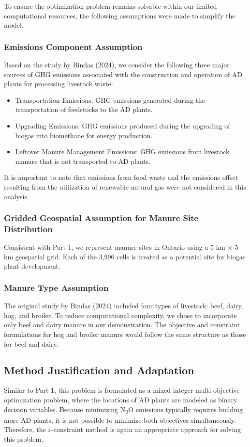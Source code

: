 \documentclass[12pt]{article}
\begin{document}
\noindent To ensure the optimization problem remains solvable within our limited computational resources, the following assumptions were made to simplify the model.

\subsubsection{Emissions Component Assumption}
Based on the study by Bindas (2024), we consider the following three major sources of GHG emissions associated with the construction and operation of AD plants for processing livestock waste:
\begin{itemize}
  \item Transportation Emissions: GHG emissions generated during the transportation of feedstocks to the AD plants.
  \item Upgrading Emissions: GHG emissions produced during the upgrading of biogas into biomethane for energy production.
  \item Leftover Manure Management Emissions: GHG emissions from livestock manure that is not transported to AD plants.
\end{itemize}
It is important to note that emissions from food waste and the emissions offset resulting from the utilization of renewable natural gas were not considered in this analysis.

\subsubsection{Gridded Geospatial Assumption for Manure Site Distribution}
Consistent with Part 1, we represent manure sites in Ontario using a 5 km × 5 km geospatial grid. Each of the 3,996 cells is treated as a potential site for biogas plant development.

\subsubsection{Manure Type Assumption}
The original study by Bindas (2024) included four types of livestock: beef, dairy, hog, and broiler. To reduce computational complexity, we chose to incorporate only beef and dairy manure in our demonstration. The objective and constraint formulations for hog and broiler manure would follow the same structure as those for beef and dairy.

\subsection{Method Justification and Adaptation}
Similar to Part 1, this problem is formulated as a mixed-integer multi-objective optimization problem, where the locations of AD plants are modeled as binary decision variables. Because minimizing N\textsubscript{2}O emissions typically requires building more AD plants, it is not possible to minimize both objectives simultaneously. Therefore, the $\varepsilon$-constraint method is again an appropriate approach for solving this problem.
\end{document}
